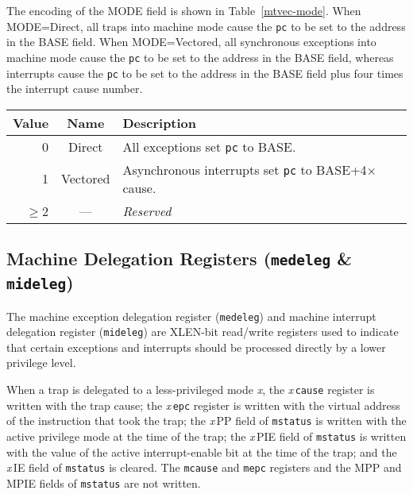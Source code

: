 \fi

The encoding of the MODE field is shown in Table~\ref{mtvec-mode}.  When
MODE=Direct, all traps into machine mode cause the \texttt{pc} to be set to the
address in the BASE field.  When MODE=Vectored, all synchronous exceptions
into machine mode cause the \texttt{pc} to be set to the address in the BASE
field, whereas interrupts cause the \texttt{pc} to be set to the address in
the BASE field plus four times the interrupt cause number.

\begin{table*}[h!]
\begin{center}
\begin{tabular}{|r|c|l|}
\hline
Value & Name & Description \\
\hline
0      & Direct   & All exceptions set \texttt{pc} to BASE. \\
1      & Vectored & Asynchronous interrupts set \texttt{pc} to BASE+4$\times$cause. \\
$\ge$2 & --- & \emph{Reserved} \\
\hline
\end{tabular}
\end{center}
\caption{Encoding of \texttt{mtvec} MODE field.}
\label{mtvec-mode}
\end{table*}

\subsection{Machine Delegation Registers
(\texttt{medeleg} \& \texttt{mideleg})} \label{machine-exception-interrupt-delegation-registers-medeleg-mideleg}

The machine exception delegation register (\texttt{medeleg}) and machine interrupt delegation register (\texttt{mideleg}) are XLEN-bit read/write registers used to indicate that certain exceptions and interrupts should be processed directly by a lower privilege level.

When a trap is delegated to a less-privileged mode \emph{x}, the
\emph{x}\,\texttt{cause} register is written with the trap cause; the
\emph{x}\,\texttt{epc} register is written with the virtual address of
the instruction that took the trap; the \emph{x}\,PP field
of \texttt{mstatus} is written with the active privilege mode at the time of
the trap; the \emph{x}\,PIE field of \texttt{mstatus} is written with the
value of the active interrupt-enable bit at the time of the trap; and
the \emph{x}\,IE field of \texttt{mstatus} is cleared.  The \texttt{mcause} and
\texttt{mepc} registers and the MPP and MPIE fields of \texttt{mstatus} are
not written.


